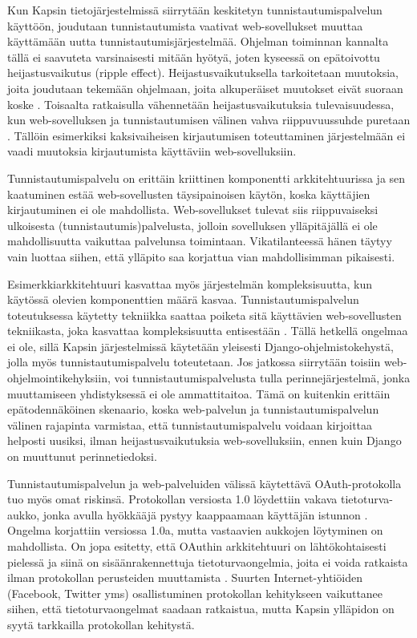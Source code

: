 Kun Kapsin tietojärjestelmissä siirrytään keskitetyn tunnistautumispalvelun käyttöön, joudutaan tunnistautumista vaativat web-sovellukset muuttaa käyttämään uutta tunnistautumisjärjestelmää. Ohjelman toiminnan kannalta tällä ei saavuteta varsinaisesti mitään hyötyä, joten kyseessä on epätoivottu heijastusvaikutus (ripple effect). Heijastusvaikutuksella tarkoitetaan muutoksia, joita joudutaan tekemään ohjelmaan, joita alkuperäiset muutokset eivät suoraan koske \cite{arkkitehtuurit}. Toisaalta ratkaisulla vähennetään heijastusvaikutuksia tulevaisuudessa, kun web-sovelluksen ja tunnistautumisen välinen vahva riippuvuussuhde puretaan \cite{arkkitehtuurit}. Tällöin esimerkiksi kaksivaiheisen kirjautumisen toteuttaminen järjestelmään ei vaadi muutoksia kirjautumista käyttäviin web-sovelluksiin.

Tunnistautumispalvelu on erittäin kriittinen komponentti arkkitehtuurissa ja sen kaatuminen estää web-sovellusten täysipainoisen käytön, koska käyttäjien kirjautuminen ei ole mahdollista. Web-sovellukset tulevat siis riippuvaiseksi ulkoisesta (tunnistautumis)palvelusta, jolloin sovelluksen ylläpitäjällä ei ole mahdollisuutta vaikuttaa palvelunsa toimintaan. Vikatilanteessä hänen täytyy vain luottaa siihen, että ylläpito saa korjattua vian mahdollisimman pikaisesti.

Esimerkkiarkkitehtuuri kasvattaa myös järjestelmän kompleksisuutta, kun käytössä olevien komponenttien määrä kasvaa. Tunnistautumispalvelun toteutuksessa käytetty tekniikka saattaa poiketa sitä käyttävien web-sovellusten tekniikasta, joka kasvattaa kompleksisuutta entisestään \cite{arkkitehtuurit}. Tällä hetkellä ongelmaa ei ole, sillä Kapsin järjestelmissä käytetään yleisesti Django-ohjelmistokehystä, jolla myös tunnistautumispalvelu toteutetaan. Jos jatkossa siirrytään toisiin web-ohjelmointikehyksiin, voi tunnistautumispalvelusta tulla perinnejärjestelmä, jonka muuttamiseen yhdistyksessä ei ole ammattitaitoa. Tämä on kuitenkin erittäin epätodennäköinen skenaario, koska web-palvelun ja tunnistautumispalvelun välinen rajapinta varmistaa, että tunnistautumispalvelu voidaan kirjoittaa helposti uusiksi, ilman heijastusvaikutuksia web-sovelluksiin, ennen kuin Django on muuttunut perinnetiedoksi.

Tunnistautumispalvelun ja web-palveluiden välissä käytettävä OAuth-protokolla tuo myös omat riskinsä. Protokollan versiosta 1.0 löydettiin vakava tietoturva-aukko, jonka avulla hyökkääjä pystyy kaappaamaan käyttäjän istunnon \cite{oauth_primer}. Ongelma korjattiin versiossa 1.0a, mutta vastaavien aukkojen löytyminen on mahdollista. On jopa esitetty, että OAuthin arkkitehtuuri on lähtökohtaisesti pielessä ja siinä on sisäänrakennettuja tietoturvaongelmia, joita ei voida ratkaista ilman protokollan perusteiden muuttamista \cite{oauth_lol}. Suurten Internet-yhtiöiden (Facebook, Twitter yms) osallistuminen protokollan kehitykseen vaikuttanee siihen, että tietoturvaongelmat saadaan ratkaistua, mutta Kapsin ylläpidon on syytä tarkkailla protokollan kehitystä.

